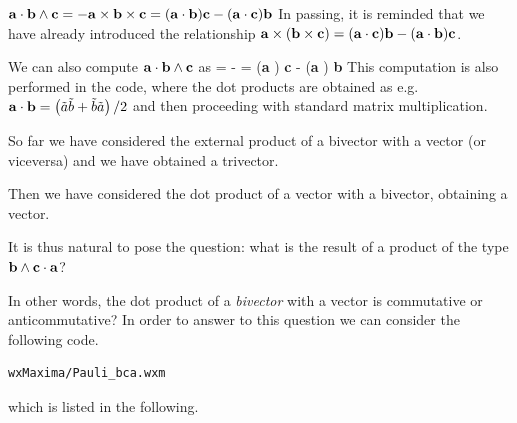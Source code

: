 \documentclass[10pt]{beamer}
\begin{document}
%
\begin{frame}[fragile]{$ 
\mathbf{a} \cdot \mathbf{b} \wedge \mathbf{c} = - \mathbf{a} \times \mathbf{b} \times \mathbf{c} = ({\bf a}  \cdot  {\bf b})    {\bf c} - ({\bf a}  \cdot  {\bf c})  {\bf b}
$}
%
In passing, it is reminded that we have already introduced the relationship 
${\bf a} \times ( {\bf b} \times  {\bf c})  =   ({\bf a}  \cdot  {\bf c})  {\bf b} -  ({\bf a}  \cdot  {\bf b})    {\bf c}$.

We can also compute $\mathbf{a} \cdot \mathbf{b} \wedge \mathbf{c}$ as
%
\be \label{adbwcatbtcc}
\Ba \cdot \Bb \wedge \Bc = - \Ba \times \Bb \times \Bc = ({\bf a}  )    {\bf c} - ({\bf a}  )  {\bf b}
\ee
%
This computation is also performed in the code, where the dot products are obtained as e.g. $\mathbf{a} \cdot \mathbf{b} = \left( \tilde{a} \tilde{b} + \tilde{b} \tilde{a} \right)/2$ and then proceeding with standard matrix multiplication.
\end{frame}
\begin{frame}[fragile]{}
%
So far we have considered the external product of a bivector with a vector (or viceversa) and we have obtained a trivector. 

Then we have considered the dot product of a vector with a bivector, obtaining a vector. 

It is thus natural to pose the question: what is the result  of a product of the type 
$ \mathbf{b} \wedge \mathbf{c}  \cdot \mathbf{a}$? 

In other words, the dot product of a \emph{bivector} with a vector is commutative or anticommutative?
In order to answer to this question we can consider the following code.

\small
\begin{verbatim}
wxMaxima/Pauli_bca.wxm
\end{verbatim}
\normalsize
%
which is listed in the following.



\end{frame}
\begin{frame}[shrink=70]{}
%
\small

\normalsize
\end{frame}
%
\end{document}
